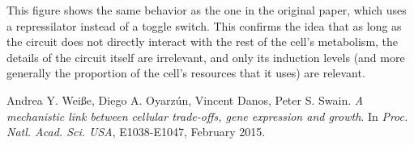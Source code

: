 \documentclass[a4paper]{article}
\begin{document}
This figure shows the same behavior as the one in the original paper, which uses a repressilator instead of a toggle switch.
This confirms the idea that as long as the circuit does not directly interact with the rest of the cell's metabolism, the details of the circuit itself are irrelevant, and only its induction levels (and more generally the proportion of the cell's resources that it uses) are relevant.

\FloatBarrier

\begin{thebibliography}{9}
	 Andrea Y. Weiße, Diego A. Oyarz\'un, Vincent Danos, Peter S. Swain. \emph{A mechanistic link between cellular trade-offs, gene expression and growth}. In \emph{Proc. Natl. Acad. Sci. USA}, E1038-E1047, February 2015. 
\end{thebibliography}
\end{document}
